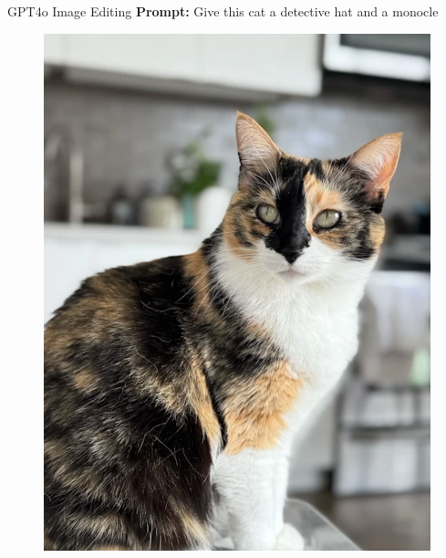 \documentclass{beamer}
\begin{document}
\begin{frame}{GPT4o Image Editing}
	\textbf{Prompt:} Give this cat a detective hat and a monocle
	\begin{minipage}[t]{0.5\columnwidth}		
		\begin{figure}
			\includegraphics[width=0.94\linewidth]{figs/gpt4o_editing1}
		\end{figure}
	\end{minipage}%
	\begin{minipage}[t]{0.45\columnwidth}		
		\begin{figure}

\end{figure}
\end{minipage}
\end{frame}
\end{document}
